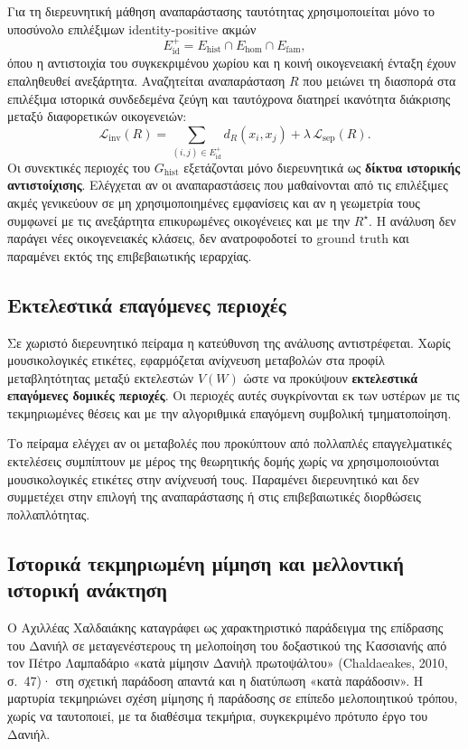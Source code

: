 \documentclass[11pt,a4paper]{article}
\begin{document}
Για τη διερευνητική μάθηση αναπαράστασης ταυτότητας χρησιμοποιείται μόνο το υποσύνολο επιλέξιμων identity-positive ακμών
\[
E_{\mathrm{id}}^{+}=E_{\mathrm{hist}}\cap E_{\mathrm{hom}}\cap E_{\mathrm{fam}},
\]
όπου η αντιστοιχία του συγκεκριμένου χωρίου και η κοινή οικογενειακή ένταξη έχουν επαληθευθεί ανεξάρτητα. Αναζητείται αναπαράσταση $R$ που μειώνει τη διασπορά στα επιλέξιμα ιστορικά συνδεδεμένα ζεύγη και ταυτόχρονα διατηρεί ικανότητα διάκρισης μεταξύ διαφορετικών οικογενειών:
\[
\mathcal{L}_{\mathrm{inv}}(R)=
\sum_{(i,j)\in E_{\mathrm{id}}^{+}} d_R(x_i,x_j)
+\lambda\,\mathcal{L}_{\mathrm{sep}}(R).
\]
Οι συνεκτικές περιοχές του $G_{\mathrm{hist}}$ εξετάζονται μόνο διερευνητικά ως \textbf{δίκτυα ιστορικής αντιστοίχισης}. Ελέγχεται αν οι αναπαραστάσεις που μαθαίνονται από τις επιλέξιμες ακμές γενικεύουν σε μη χρησιμοποιημένες εμφανίσεις και αν η γεωμετρία τους συμφωνεί με τις ανεξάρτητα επικυρωμένες οικογένειες και με την $R^\star$. Η ανάλυση δεν παράγει νέες οικογενειακές κλάσεις, δεν ανατροφοδοτεί το ground truth και παραμένει εκτός της επιβεβαιωτικής ιεραρχίας.

\subsection{Εκτελεστικά επαγόμενες περιοχές}\label{app:robust-performance}

Σε χωριστό διερευνητικό πείραμα η κατεύθυνση της ανάλυσης αντιστρέφεται. Χωρίς μουσικολογικές ετικέτες, εφαρμόζεται ανίχνευση μεταβολών στα προφίλ μεταβλητότητας μεταξύ εκτελεστών \(V(W)\) ώστε να προκύψουν \textbf{εκτελεστικά επαγόμενες δομικές περιοχές}. Οι περιοχές αυτές συγκρίνονται εκ των υστέρων με τις τεκμηριωμένες θέσεις και με την αλγοριθμικά επαγόμενη συμβολική τμηματοποίηση.

Το πείραμα ελέγχει αν οι μεταβολές που προκύπτουν από πολλαπλές επαγγελματικές εκτελέσεις συμπίπτουν με μέρος της θεωρητικής δομής χωρίς να χρησιμοποιούνται μουσικολογικές ετικέτες στην ανίχνευσή τους. Παραμένει διερευνητικό και δεν συμμετέχει στην επιλογή της αναπαράστασης ή στις επιβεβαιωτικές διορθώσεις πολλαπλότητας.

\subsection{Ιστορικά τεκμηριωμένη μίμηση και μελλοντική ιστορική ανάκτηση}\label{app:robust-ανάκτηση}

Ο Αχιλλέας Χαλδαιάκης καταγράφει ως χαρακτηριστικό παράδειγμα της επίδρασης του Δανιήλ σε μεταγενέστερους τη μελοποίηση του δοξαστικού της Κασσιανής από τον Πέτρο Λαμπαδάριο «κατὰ μίμησιν Δανιὴλ πρωτοψάλτου» (Chaldaeakes, 2010, σ.~47)· στη σχετική παράδοση απαντά και η διατύπωση «κατὰ παράδοσιν». Η μαρτυρία τεκμηριώνει σχέση μίμησης ή παράδοσης σε επίπεδο μελοποιητικού τρόπου, χωρίς να ταυτοποιεί, με τα διαθέσιμα τεκμήρια, συγκεκριμένο πρότυπο έργο του Δανιήλ.
\end{document}
